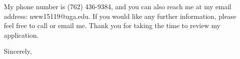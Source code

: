\documentclass{letter} %
\begin{document}
\begin{letter}
\noindent 
My phone number is (762) 436-9384, and you can also reach me at my email address: nww15119@uga.edu. If you would like any further information, please feel free to call or email me. Thank you for taking the time to review my application.
 
\closing{Sincerely,} 
 

 

\end{letter}
 
\end{document}
